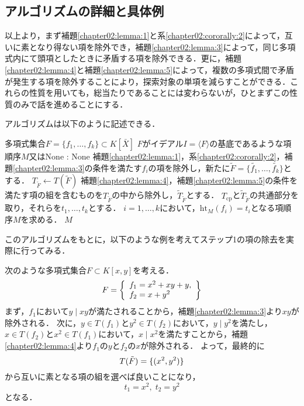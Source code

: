 \subsection{アルゴリズムの詳細と具体例}
以上より，まず補題\ref{chapter02:lemma:1}と系\ref{chapter02:cororally:2}によって，互いに素となり得ない項を除外でき，補題\ref{chapter02:lemma:3}によって，同じ多項式内にて頭項としたときに矛盾する項を除外できる．更に，補題\ref{chapter02:lemma:4}と補題\ref{chapter02:lemma:5}によって，複数の多項式間で矛盾が発生する項を除外することにより，探索対象の単項を減らすことができる．これらの性質を用いても，総当たりであることには変わらないが，ひとまずこの性質のみで話を進めることにする．
\par
アルゴリズムは以下のように記述できる．
\begin{algorithm}
	\label{chapter02:algorithm:1}
	\caption{そのまま\groebner{}基底となっているような項順序の導出}
	\begin{algorithmic}[1]
		\Require 多項式集合$F=\{f_1, \dots, f_k \} \subset K[\bar{X}]$
		\Ensure $F$がイデアル$I = \langle F \rangle$の\groebner{}基底であるような項順序$M$又はNone
		:
			\State \Return None
		\EndIf
		\State 補題\ref{chapter02:lemma:1}，系\ref{chapter02:cororally:2}，補題\ref{chapter02:lemma:3}の条件を満たす$f_i$の項を除外し，新たに$\tilde{F} = \{ \tilde{f_1}, \dots, \tilde{f_k} \}$とする．
		\State $T_{\tilde{F}} \leftarrow T(\tilde{F})$
		\State 補題\ref{chapter02:lemma:4}，補題\ref{chapter02:lemma:5}の条件を満たす項の組を含むものを$T_{\tilde{F}}$の中から除外し，$\tilde{T}_{\tilde{F}}$とする．
		\State $T_{\mathrm{cp}}$と$\tilde{T}_{\tilde{F}}$の共通部分を取り，それらを$t_1, \dots, t_k$とする．
		\State $i = 1, \dots , k$において，$\mathrm{ht}_M(f_i)=t_i$となる項順序$M$を求める．
		\State \Return $M$
	\end{algorithmic}
\end{algorithm}

このアルゴリズムをもとに，以下のような例を考えてステップ1の項の除去を実際に行ってみる．
\begin{example}
	次のような多項式集合$F \subset K[x, y]$を考える．
	\begin{equation}
		F = 
		\left\{
		\begin{array}{l}
			f_1 = x^2 + xy + y, \\
			f_2 = x + y^2 \notag
		\end{array}
		\right\}
	\end{equation}
	まず，$f_1$において$y \mid xy$が満たされることから，補題\ref{chapter02:lemma:3}より$xy$が除外される．
	次に，$y \in T(f_1)$と$y^2 \in T(f_2)$において，$y \mid y^2$を満たし，$x \in T(f_2)$と$x^2 \in T(f_1)$において，$x \mid x^2$を満たすことから，補題\ref{chapter02:lemma:4}より$f_1$の$y$と$f_2$の$x$が除外される．
	よって，最終的に
	\begin{equation}
		T(\tilde{F}) = \{ (x^2, y^2) \} \notag
	\end{equation}
	から互いに素となる項の組を選べば良いことになり，
	$$t_1 = x^2, \; t_2 = y^2$$
	となる．
\end{example}

